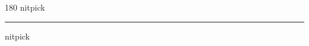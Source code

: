 
\begin{frame}
\begin{center}
\begin{turn}{180}
{\fontsize{2.5cm}{1em}\selectfont nitpick}
\end{turn}
\vspace{1em}\par  
\hrule
\vspace{1em}\par  
{\fontsize{2.5cm}{1em}\selectfont nitpick}
\end{center}
\end{frame}
